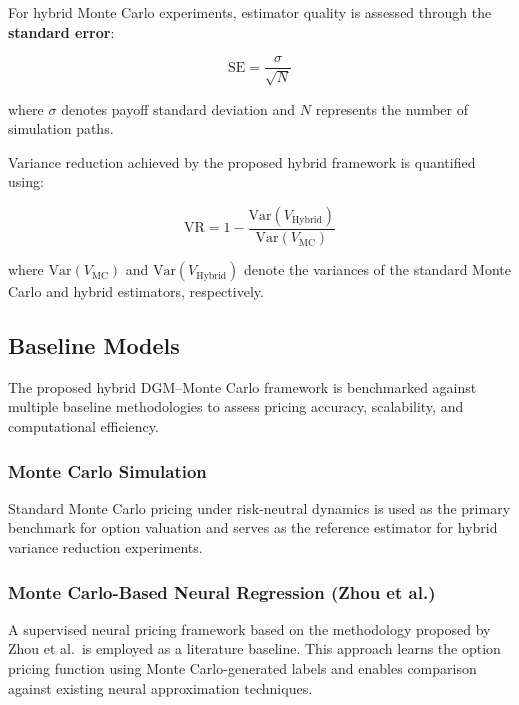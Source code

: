 \documentclass[12pt, a4paper]{article}
\begin{document}
For hybrid Monte Carlo experiments, estimator quality is assessed
through the \textbf{standard error}:

\begin{equation}
    \mathrm{SE} = \frac{\sigma}{\sqrt{N}}
    \label{eq:se}
\end{equation}

where $\sigma$ denotes payoff standard deviation and $N$ represents
the number of simulation paths.

Variance reduction achieved by the proposed hybrid framework is
quantified using:

\begin{equation}
    \mathrm{VR} = 1 - \frac{\mathrm{Var}(V_{\mathrm{Hybrid}})}
                            {\mathrm{Var}(V_{\mathrm{MC}})}
    \label{eq:vr_sec5}
\end{equation}

where $\mathrm{Var}(V_{\mathrm{MC}})$ and
$\mathrm{Var}(V_{\mathrm{Hybrid}})$ denote the variances of the
standard Monte Carlo and hybrid estimators, respectively.

\subsection{Baseline Models}

The proposed hybrid DGM--Monte Carlo framework is benchmarked against
multiple baseline methodologies to assess pricing accuracy,
scalability, and computational efficiency.

\subsubsection*{Monte Carlo Simulation}

Standard Monte Carlo pricing under risk-neutral dynamics is used as
the primary benchmark for option valuation and serves as the reference
estimator for hybrid variance reduction experiments.

\subsubsection*{Monte Carlo-Based Neural Regression (Zhou et al.)}

A supervised neural pricing framework based on the methodology
proposed by Zhou et al.\ is employed as a literature baseline. This
approach learns the option pricing function using Monte
Carlo-generated labels and enables comparison against existing neural
approximation techniques.
\end{document}
